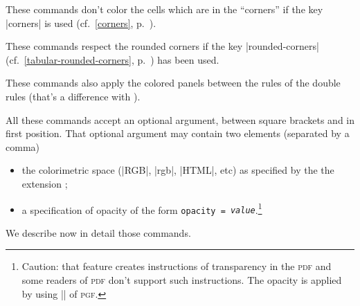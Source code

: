 \documentclass[dvipsnames]{article}
\begin{document}
\medskip
These commands don't color the cells which are in the ``corners'' if the key
|corners| is used (cf.~\ref{corners}, p.~\pageref{corners}).

\medskip
These commands respect the rounded corners if the key |rounded-corners|
(cf.~\ref{tabular-rounded-corners}, p.~\pageref{tabular-rounded-corners}) has been used.

\medskip
These commands also apply the colored panels between the rules of the double
rules (that's a difference with ).

\medskip
All these commands accept an optional argument, between square brackets and
in first position. That optional argument may contain two elements (separated
by a comma)
\begin{itemize}
\item the colorimetric space (|RGB|, |rgb|, |HTML|, etc) as specified by the
the extension ;
\item {}
a specification of opacity of the form \texttt{opacity =
  \textsl{value}}.\footnote{Caution: that feature creates instructions of
  transparency in the \textsc{pdf} and some readers of \textsc{pdf} don't
  support such instructions. The opacity is applied by using |\pgfsetfillopacity|
  of \textsc{pgf}.} 
\end{itemize}

\bigskip

We describe now in detail those commands.
\end{document}
